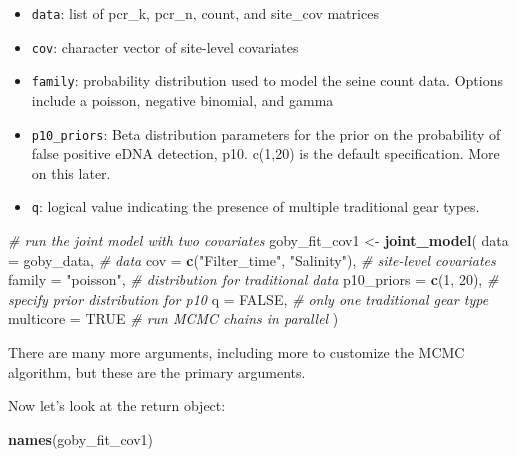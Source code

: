 \documentclass[
]{article}
\newenvironment{Shaded}{\begin{snugshade}}{\end{snugshade}}
\newcommand{\AttributeTok}[1]{\textcolor[rgb]{0.13,0.29,0.53}{#1}}
\newcommand{\CommentTok}[1]{\textcolor[rgb]{0.56,0.35,0.01}{\textit{#1}}}
\newcommand{\ConstantTok}[1]{\textcolor[rgb]{0.56,0.35,0.01}{#1}}
\newcommand{\DecValTok}[1]{\textcolor[rgb]{0.00,0.00,0.81}{#1}}
\newcommand{\FunctionTok}[1]{\textcolor[rgb]{0.13,0.29,0.53}{\textbf{#1}}}
\newcommand{\NormalTok}[1]{#1}
\newcommand{\OtherTok}[1]{\textcolor[rgb]{0.56,0.35,0.01}{#1}}
\newcommand{\StringTok}[1]{\textcolor[rgb]{0.31,0.60,0.02}{#1}}
\begin{document}
\begin{itemize}
\item
  \texttt{data}: list of pcr\_k, pcr\_n, count, and site\_cov matrices
\item
  \texttt{cov}: character vector of site-level covariates
\item
  \texttt{family}: probability distribution used to model the seine
  count data. Options include a poisson, negative binomial, and gamma
\item
  \texttt{p10\_priors}: Beta distribution parameters for the prior on
  the probability of false positive eDNA detection, p10. c(1,20) is the
  default specification. More on this later.
\item
  \texttt{q}: logical value indicating the presence of multiple
  traditional gear types.
\end{itemize}

\begin{Shaded}
\begin{Highlighting}[]
\CommentTok{\# run the joint model with two covariates}
\NormalTok{goby\_fit\_cov1 }\OtherTok{\textless{}{-}} \FunctionTok{joint\_model}\NormalTok{(}
  \AttributeTok{data =}\NormalTok{ goby\_data, }\CommentTok{\# data}
  \AttributeTok{cov =} \FunctionTok{c}\NormalTok{(}\StringTok{"Filter\_time"}\NormalTok{, }\StringTok{"Salinity"}\NormalTok{), }\CommentTok{\# site{-}level covariates}
  \AttributeTok{family =} \StringTok{"poisson"}\NormalTok{, }\CommentTok{\# distribution for traditional data}
  \AttributeTok{p10\_priors =} \FunctionTok{c}\NormalTok{(}\DecValTok{1}\NormalTok{, }\DecValTok{20}\NormalTok{), }\CommentTok{\# specify prior distribution for p10}
  \AttributeTok{q =} \ConstantTok{FALSE}\NormalTok{, }\CommentTok{\# only one traditional gear type}
  \AttributeTok{multicore =} \ConstantTok{TRUE} \CommentTok{\# run MCMC chains in parallel}
\NormalTok{)}
\end{Highlighting}
\end{Shaded}

There are many more arguments, including more to customize the MCMC
algorithm, but these are the primary arguments.

Now let's look at the return object:

\begin{Shaded}
\begin{Highlighting}[]
\FunctionTok{names}\NormalTok{(goby\_fit\_cov1)}
\end{Highlighting}
\end{Shaded}
\end{document}
